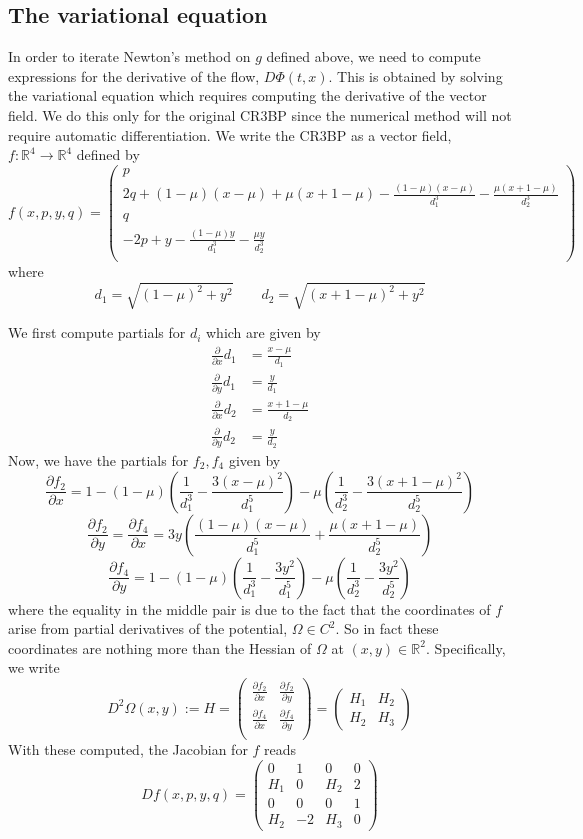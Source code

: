 \documentclass[10pt]{article}
\newcommand{\rr}{\mathbb{R}}
\newcommand{\pardiff}[2]{\frac{\partial #1}{\partial #2}}
\newcommand{\paren}[1]{\left( #1 \right)}
\begin{document}
\subsection{The variational equation}
In order to iterate Newton's method on $g$ defined above, we need to compute expressions for the derivative of the flow, $D\Phi(t, x)$. This is obtained by solving the variational equation which requires computing the derivative of the vector field. We do this only for the original CR3BP since the numerical method will not require automatic differentiation. 
We write the CR3BP as a vector field, $f: \rr^4 \to \rr^4$ defined by 
\[
f(x,p,y,q) = 
\begin{pmatrix}
p \\
2q + \left(1 - \mu\right)\left(x - \mu\right) + \mu\left(x + 1 - \mu\right) - \frac{\paren{1 - \mu} \paren{x - \mu}}{d_1^3} - \frac{\mu \paren{x + 1 - \mu}}{d_2^3} \\
q \\
 - 2p + y - \frac{\paren{1-\mu}y}{d_1^3} - \frac{\mu y}{d_2^3} \\
\end{pmatrix}
\]
where 
\[
d_1 = \sqrt{\paren{1 - \mu}^2 + y^2} \qquad d_2 = \sqrt{\paren{x + 1 - \mu}^2 + y^2}
\]

We first compute partials for $d_i$ which are given by 
\begin{align*}
	\pardiff{}{x} d_1 & = \frac{x - \mu}{d_1} \\
	\pardiff{}{y} d_1 & = \frac{y}{d_1} \\
	\pardiff{}{x} d_2 & = \frac{x + 1 - \mu}{d_2} \\
	\pardiff{}{y} d_2 & = \frac{y}{d_2} 
\end{align*}
Now, we have the partials for $f_2, f_4$ given by 
\[
\pardiff{f_2}{x} = 1 - \paren{1 - \mu} \paren{\frac{1}{d_1^3} - \frac{3 (x- \mu)^2}{d_1^5}} - \mu \paren{\frac{1}{d_2^3} - \frac{3 (x + 1 - \mu)^2}{d_2^5}}
\]
\[
\pardiff{f_2}{y} = \pardiff{f_4}{x} = 3 y \paren{\frac{(1- \mu)(x- \mu)}{d_1^5} + \frac{\mu (x + 1 - \mu)}{d_2^5}}
\]
\[
\pardiff{f_4}{y} = 1 - \paren{1 - \mu} \paren{\frac{1}{d_1^3} - \frac{3 y^2}{d_1^5}} - \mu \paren{\frac{1}{d_2^3} - \frac{3y^2}{d_2^5}}
\]
where the equality in the middle pair is due to the fact that the coordinates of $f$ arise from partial derivatives of the potential, $\Omega \in C^2$. So in fact these coordinates are nothing more than the Hessian of $\Omega$ at $(x,y) \in \rr^2$. Specifically, we write
\[
D^2 \Omega(x,y) := H = 
\begin{pmatrix}
\pardiff{f_2}{x}  & \pardiff{f_2}{y}  \\
\pardiff{f_4}{x}  & \pardiff{f_4}{y}  \\
\end{pmatrix}
= 
\begin{pmatrix}
H_1 & H_2 \\
H_2 & H_3
\end{pmatrix}
\]
With these computed, the Jacobian for $f$ reads
\[
Df(x,p,y,q) = 
\begin{pmatrix}
0 & 1 & 0 & 0 \\
H_1 & 0 & H_2  & 2 \\
0 & 0 & 0 & 1 \\
H_2 & -2 & H_3 & 0 
\end{pmatrix}
\]
\end{document}
